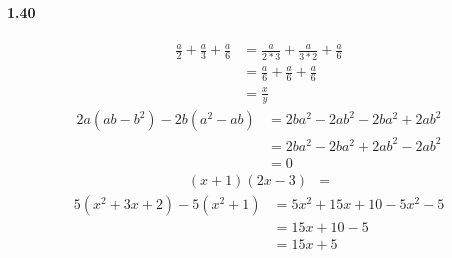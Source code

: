 \documentclass{article}
\begin{document}
\paragraph{1.40}
\begin{align*}
  \frac{a}{2} + \frac{a}{3} + \frac{a}{6} &= \frac{a}{2*3} + \frac{a}{3*2} + \frac{a}{6} \\
  &= \frac{a}{6} + \frac{a}{6} + \frac{a}{6} \\
  &= \frac{x}{y}
\end{align*}
\begin{align*}
  2a(ab - b^2) - 2b(a^2 - ab) &= 2ba^2 - 2ab^2 - 2ba^2 + 2ab^2 \\
  &= 2ba^2 - 2ba^2 + 2ab^2 - 2ab^2 \\
  &= 0
\end{align*}
\begin{align*}
  (x + 1)(2x - 3) &= 
\end{align*}
\begin{align*}
  5(x^2 + 3x + 2) - 5(x^2 + 1) &= 5x^2 + 15x + 10 - 5x^2 - 5 \\
  &= 15x + 10 - 5 \\
  &= 15x + 5
\end{align*}
\end{document}
